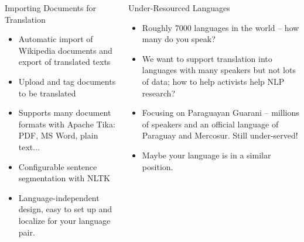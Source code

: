 \documentclass[final]{beamer}
\begin{document}
\begin{frame}{}
\begin{columns}[t]
\begin{column}{.32\linewidth}
  \begin{block}{\large Importing Documents for Translation}
    \centering
    \begin{itemize}
    \item Automatic import of Wikipedia documents and export of translated texts
    \item Upload and tag documents to be translated
    \item Supports many document formats with Apache Tika: PDF, MS Word, plain
    text...
    \item Configurable sentence segmentation with NLTK
    \item Language-independent design, easy to set up and localize for your
    language pair.
    \end{itemize}
  \end{block}

  \end{column}

  \begin{column}{.32\linewidth}

  \vfill
  \begin{block}{\large Under-Resourced Languages}
    \begin{itemize}
    \item Roughly 7000 languages in the world -- how many do you speak?
    \item We want to support translation into languages with many speakers
    but not lots of data; how to help activists help NLP research?
    \item Focusing on Paraguayan Guarani -- millions of speakers and an
    official language of Paraguay and Mercosur. Still under-served!
    \item Maybe your language is in a similar position.
    \end{itemize}
  \end{block}


\end{column}
\end{columns}
\end{frame}
\end{document}
